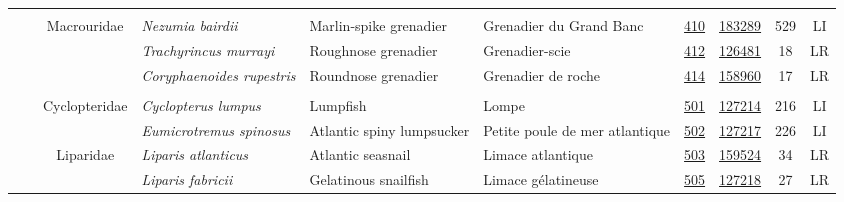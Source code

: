 \documentclass[12pt]{article}\usepackage[]{graphicx}\usepackage[]{color}
\begin{document}
\begin{landscapepage}
\begin{longtable}[t]{ccc>{\centering\arraybackslash}p{3cm}>{\centering\arraybackslash}p{3cm}>{\centering\arraybackslash}p{3cm}>{}c>{}ccc}
\nopagebreak
\addlinespace[0.3em]
\\
\hspace{1em}\hspace{1em} &  & Macrouridae & \em{Nezumia bairdii} & Marlin-spike grenadier & Grenadier du Grand Banc & \href{#sec:410}{410} & \href{http://www.marinespecies.org/aphia.php?p=taxdetails&id=183289}{183289} & 529 & LI\\
\nopagebreak
\hspace{1em}\hspace{1em} &  &  & \em{Trachyrincus murrayi} & Roughnose grenadier & Grenadier-scie & \href{#sec:412}{412} & \href{http://www.marinespecies.org/aphia.php?p=taxdetails&id=126481}{126481} & 18 & LR\\
\nopagebreak
\hspace{1em}\hspace{1em} &  &  & \em{Coryphaenoides rupestris} & Roundnose grenadier & Grenadier de roche & \href{#sec:414}{414} & \href{http://www.marinespecies.org/aphia.php?p=taxdetails&id=158960}{158960} & 17 & LR\\
\nopagebreak
\addlinespace[0.3em]
\\
\hspace{1em}\hspace{1em} &  & Cyclopteridae & \em{Cyclopterus lumpus} & Lumpfish & Lompe & \href{#sec:501}{501} & \href{http://www.marinespecies.org/aphia.php?p=taxdetails&id=127214}{127214} & 216 & LI\\
\nopagebreak
\hspace{1em}\hspace{1em} &  &  & \em{Eumicrotremus spinosus} & Atlantic spiny lumpsucker & Petite poule de mer atlantique & \href{#sec:502}{502} & \href{http://www.marinespecies.org/aphia.php?p=taxdetails&id=127217}{127217} & 226 & LI\\
\nopagebreak
\hspace{1em}\hspace{1em} &  & Liparidae & \em{Liparis atlanticus} & Atlantic seasnail & Limace atlantique & \href{#sec:503}{503} & \href{http://www.marinespecies.org/aphia.php?p=taxdetails&id=159524}{159524} & 34 & LR\\
\nopagebreak
\hspace{1em}\hspace{1em} &  &  & \em{Liparis fabricii} & Gelatinous snailfish & Limace gélatineuse & \href{#sec:505}{505} & \href{http://www.marinespecies.org/aphia.php?p=taxdetails&id=127218}{127218} & 27 & LR\\

\end{longtable}
\end{landscapepage}
\end{document}
